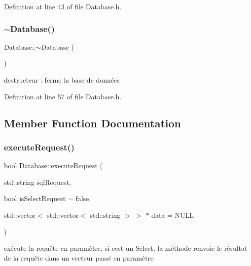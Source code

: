 Definition at line 43 of file Database.\+h.

\mbox{\label{class_database_a84d399a2ad58d69daab9b05330e1316d}} 
\subsubsection{\texorpdfstring{$\sim$\+Database()}{~Database()}}
{\footnotesize\ttfamily Database\+::$\sim$\+Database (\begin{DoxyParamCaption}{ }\end{DoxyParamCaption})\hspace{0.3cm}{\ttfamily [inline]}}



destructeur \+: ferme la base de données 



Definition at line 57 of file Database.\+h.



\subsection{Member Function Documentation}
\mbox{\label{class_database_abbcb06c60168be70c736564c4b78747f}} 
\subsubsection{\texorpdfstring{execute\+Request()}{executeRequest()}}
{\footnotesize\ttfamily bool Database\+::execute\+Request (\begin{DoxyParamCaption}\item[{std\+::string}]{sql\+Request,  }\item[{bool}]{is\+Select\+Request = {\ttfamily false},  }\item[{std\+::vector$<$ std\+::vector$<$ std\+::string $>$ $>$ $\ast$}]{data = {\ttfamily NULL} }\end{DoxyParamCaption})}



exécute la requête en paramètre, si c\textquotesingle{}est un Select, la méthode renvoie le résultat de la requête dans un vecteur passé en paramètre 


